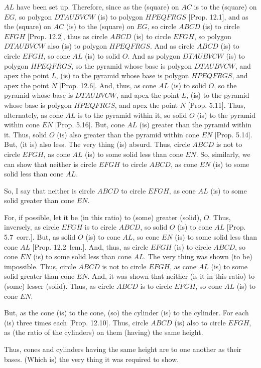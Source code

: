 \begin{Parallel}{}{}
{$AL$ have been set up.
Therefore, since as the (square) on $AC$ is to the (square) on $EG$, so polygon $DTAUBVCW$ (is) to
polygon $HPEQFRGS$ [Prop. 12.1], and as the (square) on $AC$ (is) to the (square) on $EG$,
so circle $ABCD$ (is) to circle $EFGH$ [Prop. 12.2], thus as circle $ABCD$ (is) to
circle $EFGH$, so polygon $DTAUBVCW$ also (is) to polygon $HPEQFRGS$. And as circle $ABCD$ (is) to circle
$EFGH$, so cone $AL$ (is) to solid $O$. And as polygon $DTAUBVCW$ (is) to polygon $HPEQFRGS$, so the
pyramid whose base is polygon $DTAUBVCW$, and apex the point $L$, (is) to  the pyramid whose base is
polygon $HPEQFRGS$, and apex the point $N$ [Prop. 12.6]. And, thus, as cone $AL$ (is)
to solid $O$, so the pyramid whose base is $DTAUBVCW$, and apex the point $L$, (is) to  the pyramid whose base is
polygon $HPEQFRGS$, and apex the point $N$ [Prop. 5.11]. Thus, alternately, as cone $AL$ is to the pyramid within it, so solid $O$
(is) to the pyramid within cone $EN$ [Prop. 5.16]. But, cone $AL$ (is) greater than the
pyramid within it. Thus, solid $O$ (is) also greater than the pyramid within cone $EN$ [Prop. 5.14]. But,
(it is) also less. The very thing (is) absurd. Thus, circle $ABCD$ is not to circle $EFGH$, as cone $AL$
(is) to some solid less than cone $EN$. So, similarly, we can show that neither is circle $EFGH$
to circle $ABCD$, as cone $EN$ (is) to some solid less than cone $AL$.

So, I say that neither is circle $ABCD$ to circle $EFGH$, as cone $AL$ (is) to some solid greater than
cone $EN$.

For, if possible, let it be (in this ratio) to (some) greater (solid), $O$. Thus, inversely, as circle $EFGH$ is to circle
$ABCD$, so solid $O$ (is) to cone $AL$ [Prop. 5.7~corr.]. But, as solid $O$ (is) to cone $AL$, so cone $EN$ (is) to some
solid less than cone $AL$ [Prop. 12.2~lem.].  And, thus, as circle $EFGH$
(is)  to circle $ABCD$, so cone $EN$ (is) to some solid less than cone $AL$. The very thing was shown
(to be) impossible. Thus, circle $ABCD$ is not to circle $EFGH$, as cone $AL$ (is) to some solid greater than
cone $EN$. And, it was shown that neither (is it in this ratio) to (some) lesser (solid). Thus, as circle $ABCD$ is to circle
$EFGH$, so cone $AL$ (is) to cone $EN$.

But, as the cone (is) to the cone, (so) the cylinder (is) to the cylinder. For each (is) three times each [Prop. 12.10]. Thus, circle $ABCD$ (is) also to circle $EFGH$, as  (the ratio of the cylinders) on them (having) the
same height.

Thus, cones and cylinders having the same height are to one another as their bases. (Which is) the very thing
it was required to show.}
\end{Parallel}

